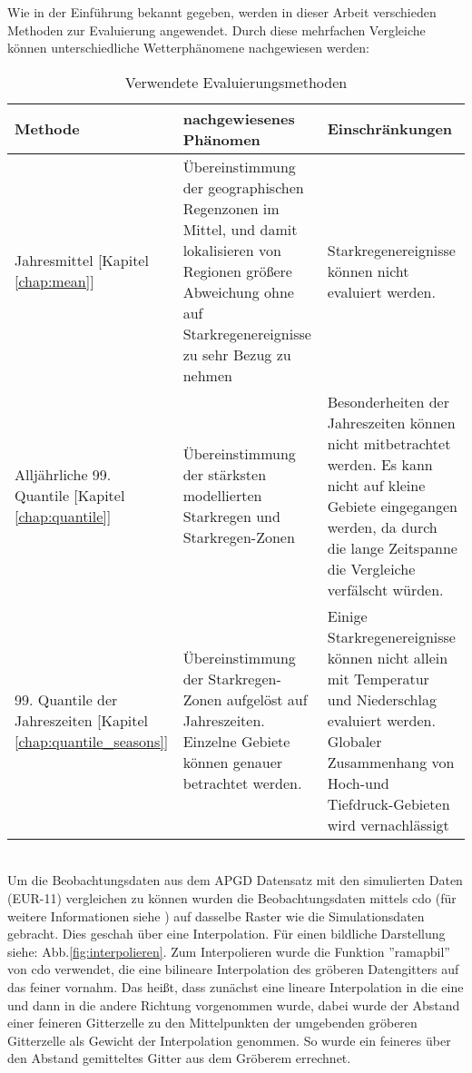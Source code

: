 Wie in der Einführung bekannt gegeben, werden in dieser Arbeit verschieden Methoden zur Evaluierung angewendet. Durch diese mehrfachen Vergleiche können unterschiedliche Wetterphänomene nachgewiesen werden:\\
\begin{table}[h!]
	\begin{tabularx}{\textwidth}{|X|X|X|}
		\hline
		\textbf{Methode} & \textbf{nachgewiesenes Phänomen}& \textbf{Einschränkungen}\\
		\hline
		Jahresmittel [Kapitel \ref{chap:mean}] & Übereinstimmung der geographischen Regenzonen im Mittel, und damit lokalisieren von Regionen größere Abweichung ohne auf Starkregenereignisse zu sehr Bezug zu nehmen & Starkregenereignisse können nicht evaluiert werden.\\
		\hline
		Alljährliche 99. Quantile [Kapitel \ref{chap:quantile}] & Übereinstimmung der stärksten modellierten Starkregen und Starkregen-Zonen & Besonderheiten der Jahreszeiten können nicht mitbetrachtet werden. Es kann nicht auf kleine Gebiete eingegangen werden, da durch die lange Zeitspanne die Vergleiche verfälscht würden.\\
		\hline
		99. Quantile der Jahreszeiten [Kapitel \ref{chap:quantile_seasons}] & Übereinstimmung der Starkregen-Zonen aufgelöst auf Jahreszeiten. Einzelne Gebiete können genauer betrachtet werden. & Einige Starkregenereignisse können nicht allein mit Temperatur und Niederschlag evaluiert werden. Globaler Zusammenhang von Hoch-und Tiefdruck-Gebieten wird vernachlässigt\\
		\hline
	\end{tabularx}
\caption{Verwendete Evaluierungsmethoden}
\end{table}
\hfill\\
Um die Beobachtungsdaten aus dem APGD\cite{meteoswiss} Datensatz mit den simulierten Daten (EUR-11) vergleichen zu können wurden die Beobachtungsdaten mittels cdo (für weitere Informationen siehe \cite{cdo}) auf dasselbe Raster wie die Simulationsdaten gebracht. Dies geschah über eine Interpolation. Für einen bildliche Darstellung siehe: Abb.\ref{fig:interpolieren}. Zum Interpolieren wurde die Funktion ''ramapbil'' von cdo verwendet, die eine bilineare Interpolation des gröberen Datengitters auf das feiner vornahm. Das heißt, dass zunächst eine lineare Interpolation in die eine und dann in die andere Richtung vorgenommen wurde, dabei wurde der Abstand einer feineren Gitterzelle zu den Mittelpunkten der umgebenden gröberen Gitterzelle als Gewicht der Interpolation genommen. So wurde ein feineres über den Abstand gemitteltes Gitter aus dem Gröberem errechnet.\\

